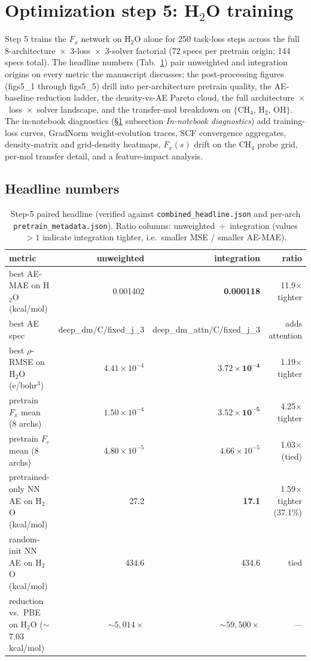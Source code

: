 \documentclass[11pt,letterpaper]{article}
\begin{document}
\section{Optimization step 5: H$_2$O training}
\label{S:sec:step5}

Step 5 trains the $F_x$ network on H$_2$O alone for 250 task-loss steps
across the full 8-architecture~$\times$~3-loss~$\times$~3-solver factorial
(72 specs per pretrain origin; 144 specs total). The headline numbers
(Tab.~\ref{S:tab:step5_headline}) pair unweighted and integration origins
on every metric the manuscript discusses; the post-processing figures
(figs5\_1 through figs5\_5) drill into per-architecture pretrain quality,
the AE-baseline reduction ladder, the density-vs-AE Pareto cloud, the
full architecture~$\times$~loss~$\times$~solver landscape, and the
transfer-mol breakdown on $\{$CH$_4$, H$_2$, OH$\}$. The in-notebook
diagnostics (\S\ref{S:sec:step5} subsection \emph{In-notebook diagnostics})
add training-loss curves, GradNorm weight-evolution traces, SCF
convergence aggregates, density-matrix and grid-density heatmaps,
$F_x(s)$ drift on the CH$_4$ probe grid, per-mol transfer detail, and a
feature-impact analysis.

\subsection{Headline numbers}
\label{S:sec:step5_headline}

\begin{table}[h]
\centering
\caption{Step-5 paired headline (verified against
\texttt{combined\_headline.json} and per-arch
\texttt{pretrain\_metadata.json}). Ratio columns: unweighted~$\div$~integration
(values $>1$ indicate integration tighter, i.e.\ smaller MSE / smaller AE-MAE).}
\label{S:tab:step5_headline}
\small
\begin{tabular}{lrrr}
\toprule
metric & unweighted & integration & ratio \\
\midrule
best AE-MAE on H$_2$O (kcal/mol) & 0.001402 & \textbf{0.000118} & 11.9$\times$ tighter \\
best AE spec & deep\_dm/C/fixed\_j\_3 & deep\_dm\_attn/C/fixed\_j\_3 & adds attention \\
best $\rho$-RMSE on H$_2$O (e/bohr$^3$) & $4.41\!\times\!10^{-4}$ & $\mathbf{3.72\!\times\!10^{-4}}$ & 1.19$\times$ tighter \\
pretrain $F_x$ mean (8 archs) & $1.50\!\times\!10^{-4}$ & $\mathbf{3.52\!\times\!10^{-5}}$ & 4.25$\times$ tighter \\
pretrain $F_c$ mean (8 archs) & $4.80\!\times\!10^{-5}$ & $4.66\!\times\!10^{-5}$ & 1.03$\times$ (tied) \\
pretrained-only NN AE on H$_2$O (kcal/mol) & 27.2 & \textbf{17.1} & 1.59$\times$ tighter (37.1\%) \\
random-init NN AE on H$_2$O (kcal/mol) & 434.6 & 434.6 & tied \\
reduction vs.\ PBE on H$_2$O ($\sim$7.03 kcal/mol) & $\sim 5{,}014\!\times$ & $\sim 59{,}500\!\times$ & --- \\
\bottomrule
\end{tabular}
\end{table}
\end{document}

